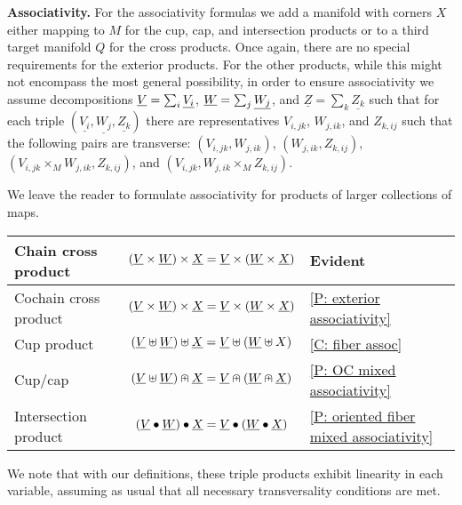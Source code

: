 \bigskip

\textbf{Associativity.}
For the associativity formulas we add a manifold with corners $X$ either mapping to $M$ for the cup, cap, and intersection products or to a third target manifold $Q$ for the cross products. Once again, there are no special requirements for the exterior products. For the other products, while this might not encompass the most general possibility, in order to ensure associativity we assume decompositions  $\underline{V}=\sum_i \underline{V_i}$, $\underline{W}=\sum_j \underline{W_j}$, and  $\underline{Z}=\sum_k \underline{Z_k}$ such that for each triple $(\underline{V_i},\underline{W_j}, \underline{Z_k})$ there are representatives $V_{i,jk}$, $W_{j,ik}$, and $Z_{k,ij}$ such that the following pairs are transverse: $(V_{i,jk}, W_{j,ik})$, $(W_{j,ik},Z_{k,ij})$, $(V_{i,jk}\times_M W_{j,ik},Z_{k,ij})$, and $(V_{i,jk}, W_{j,ik}\times_M Z_{k,ij})$.

We leave the reader to formulate associativity for products of larger collections of maps.


\bigskip

\begin{minipage}{\linewidth}
\centering





\begin{tabular}{|l|c|l|}
\hline
Chain cross product& $(\underline{V}\times \underline{W})\times \underline{X}=\underline{V}\times (\underline{W}\times \underline{X})$&Evident\\
\hline
Cochain cross product& $(\underline{V}\times \underline{W})\times \underline{X}=\underline{V}\times (\underline{W}\times \underline{X})$&\cref{P: exterior associativity}\\
\hline
Cup product &$(\underline{V}\uplus \underline{W})\uplus\underline{X}=\underline{V}\uplus(\underline{W}\uplus X)$&\cref{C: fiber assoc} \\
\hline
Cup/cap & $(\underline{V} \uplus \underline{W})\nplus \underline{X}=\underline{V}\nplus(\underline{W}\nplus\underline{X})$& \cref{P: OC mixed associativity}\\
\hline
Intersection product &
$(\underline{V}\bullet\underline{W})\bullet\underline{X}=\underline{V}\bullet(\underline{W}\bullet \underline{X})$&\cref{P: oriented fiber mixed associativity}\\
\hline
\end{tabular}
\end{minipage}

\bigskip

We note that with our definitions, these triple products exhibit linearity in each variable, assuming as usual that all necessary transversality conditions are met.



